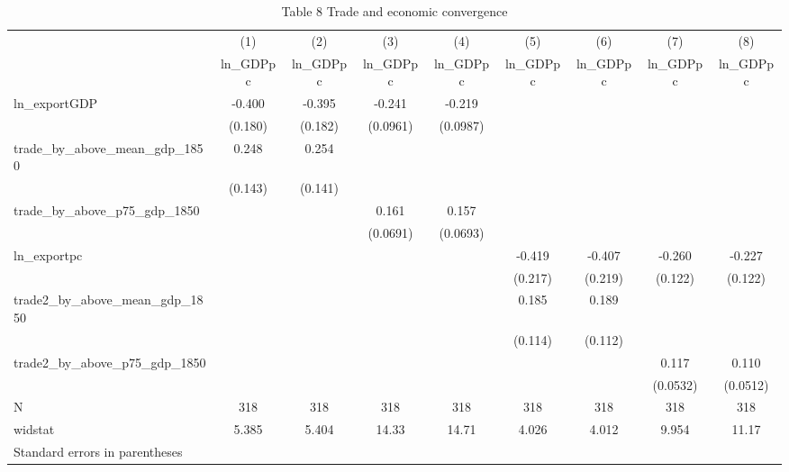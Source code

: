 \begin{table}[htbp]\centering
\caption{Table 8 Trade and economic convergence}
\begin{tabular}{l*{8}{c}}
\hline\hline
            &\multicolumn{1}{c}{(1)}&\multicolumn{1}{c}{(2)}&\multicolumn{1}{c}{(3)}&\multicolumn{1}{c}{(4)}&\multicolumn{1}{c}{(5)}&\multicolumn{1}{c}{(6)}&\multicolumn{1}{c}{(7)}&\multicolumn{1}{c}{(8)}\\
            &\multicolumn{1}{c}{ln\_GDPpc}&\multicolumn{1}{c}{ln\_GDPpc}&\multicolumn{1}{c}{ln\_GDPpc}&\multicolumn{1}{c}{ln\_GDPpc}&\multicolumn{1}{c}{ln\_GDPpc}&\multicolumn{1}{c}{ln\_GDPpc}&\multicolumn{1}{c}{ln\_GDPpc}&\multicolumn{1}{c}{ln\_GDPpc}\\
\hline
ln\_exportGDP&      -0.400&      -0.395&      -0.241&      -0.219&            &            &            &            \\
            &     (0.180)&     (0.182)&    (0.0961)&    (0.0987)&            &            &            &            \\
[1em]
trade\_by\_above\_mean\_gdp\_1850&       0.248&       0.254&            &            &            &            &            &            \\
            &     (0.143)&     (0.141)&            &            &            &            &            &            \\
[1em]
trade\_by\_above\_p75\_gdp\_1850&            &            &       0.161&       0.157&            &            &            &            \\
            &            &            &    (0.0691)&    (0.0693)&            &            &            &            \\
[1em]
ln\_exportpc &            &            &            &            &      -0.419&      -0.407&      -0.260&      -0.227\\
            &            &            &            &            &     (0.217)&     (0.219)&     (0.122)&     (0.122)\\
[1em]
trade2\_by\_above\_mean\_gdp\_1850&            &            &            &            &       0.185&       0.189&            &            \\
            &            &            &            &            &     (0.114)&     (0.112)&            &            \\
[1em]
trade2\_by\_above\_p75\_gdp\_1850&            &            &            &            &            &            &       0.117&       0.110\\
            &            &            &            &            &            &            &    (0.0532)&    (0.0512)\\
\hline
N           &         318&         318&         318&         318&         318&         318&         318&         318\\
widstat     &       5.385&       5.404&       14.33&       14.71&       4.026&       4.012&       9.954&       11.17\\
\hline\hline
\multicolumn{9}{l}{\footnotesize Standard errors in parentheses}\\
\end{tabular}
\end{table}
